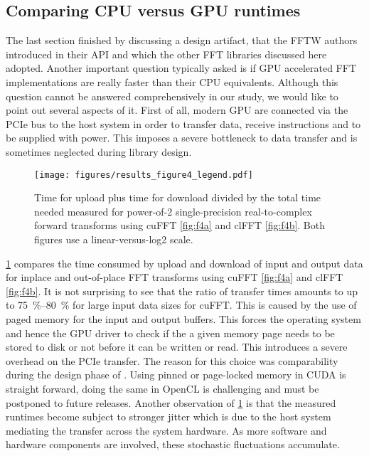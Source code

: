\subsection{Comparing CPU versus GPU runtimes}
\label{ssec:cpu_vs_gpu}

The last section finished by discussing a design artifact, that the FFTW authors introduced in their API and which the other FFT libraries discussed here adopted. Another important question typically asked is if GPU accelerated FFT implementations are really faster than their CPU equivalents. Although this question cannot be answered comprehensively in our study, we would like to point out several aspects of it. First of all, modern GPU are connected via the PCIe bus to the host system in order to transfer data, receive instructions and to be supplied with power. This imposes a severe bottleneck to data transfer and is sometimes neglected during library design. 

\begin{figure}[!tbp]
  \centering
  \texttt{[image: figures/results\_figure4\_legend.pdf]}
  \hfill
  \caption{Time for upload plus time for download divided by the total time needed measured for power-of-2 single-precision real-to-complex forward transforms using cuFFT \cref{fig:f4a} and clFFT \cref{fig:f4b}. Both figures use a linear-versus-log2 scale.}
  \label{fig:device_transfer}
\end{figure}

\cref{fig:device_transfer} compares the time consumed by upload and download of input and output data for inplace and out-of-place FFT transforms using cuFFT \cref{fig:f4a} and clFFT \cref{fig:f4b}. It is not surprising to see that the ratio of transfer times amounts to up to \SIrange{75}{80}{\percent} for large input data sizes for cuFFT. This is caused by the use of paged memory for the input and output buffers. This forces the operating system and hence the GPU driver to check if the a given memory page needs to be stored to disk or not before it can be written or read. This introduces a severe overhead on the PCIe transfer. The reason for this choice was comparability during the design phase of \gearshifft{}. Using pinned or page-locked memory in CUDA is straight forward, doing the same in OpenCL is challenging and must be postponed to future releases. Another observation of \cref{fig:device_transfer} is that the measured runtimes become subject to stronger jitter  which is due to the host system mediating the transfer across the system hardware. As more software and hardware components are involved, these stochastic fluctuations accumulate. 

